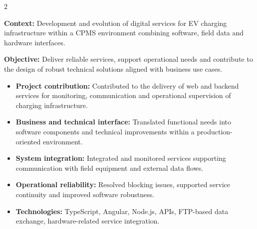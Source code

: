 \documentclass[8pt,a4paper,ragged2e,withhyper]{altacv}
\begin{document}


\makecvheader
{}

\begin{paracol}{2}



\textbf{Context:} Development and evolution of digital services for EV charging infrastructure within a CPMS environment combining software, field data and hardware interfaces.

\textbf{Objective:} Deliver reliable services, support operational needs and contribute to the design of robust technical solutions aligned with business use cases.

\begin{itemize}
\item \textbf{Project contribution:} Contributed to the delivery of web and backend services for monitoring, communication and operational supervision of charging infrastructure.
\item \textbf{Business and technical interface:} Translated functional needs into software components and technical improvements within a production-oriented environment.
\item \textbf{System integration:} Integrated and monitored services supporting communication with field equipment and external data flows.
\item \textbf{Operational reliability:} Resolved blocking issues, supported service continuity and improved software robustness.
\item \textbf{Technologies:} TypeScript, Angular, Node.js, APIs, FTP-based data exchange, hardware-related service integration.
\end{itemize}

\divider



\end{paracol}
\end{document}
